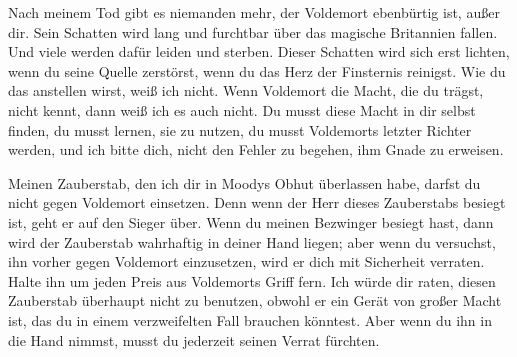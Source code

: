 \begin{writtenNote}
Nach meinem Tod gibt es niemanden mehr, der Voldemort ebenbürtig ist, außer dir. Sein Schatten wird lang und furchtbar über das magische Britannien fallen. Und viele werden dafür leiden und sterben. Dieser Schatten wird sich erst lichten, wenn du seine Quelle zerstörst, wenn du das Herz der Finsternis reinigst. Wie du das anstellen wirst, weiß ich nicht. Wenn Voldemort die Macht, die du trägst, nicht kennt, dann weiß ich es auch nicht. Du musst diese Macht in dir selbst finden, du musst lernen, sie zu nutzen, du musst Voldemorts letzter Richter werden, und ich bitte dich, nicht den Fehler zu begehen, ihm Gnade zu erweisen.

Meinen Zauberstab, den ich dir in Moodys Obhut überlassen habe, darfst du nicht gegen Voldemort einsetzen. Denn wenn der Herr dieses Zauberstabs besiegt ist, geht er auf den Sieger über. Wenn du meinen Bezwinger besiegt hast, dann wird der Zauberstab wahrhaftig in deiner Hand liegen; aber wenn du versuchst, ihn vorher gegen Voldemort einzusetzen, wird er dich mit Sicherheit verraten. Halte ihn um jeden Preis aus Voldemorts Griff fern. Ich würde dir raten, diesen Zauberstab überhaupt nicht zu benutzen, obwohl er ein Gerät von großer Macht ist, das du in einem verzweifelten Fall brauchen könntest. Aber wenn du ihn in die Hand nimmst, musst du jederzeit seinen Verrat fürchten.


\end{writtenNote}
